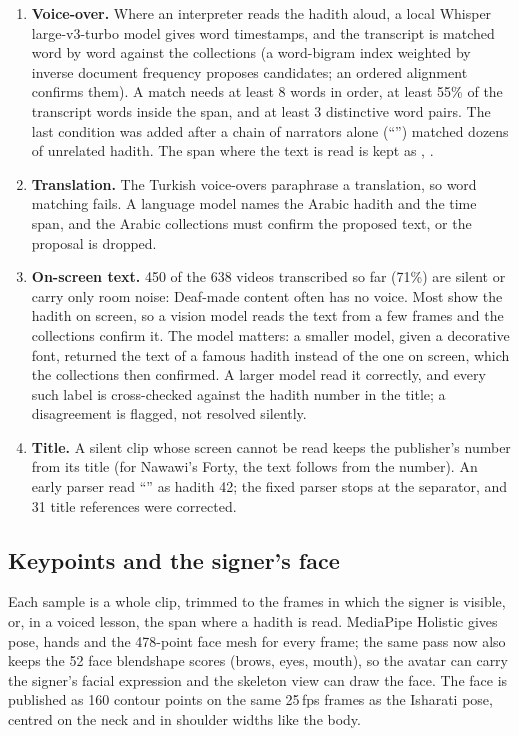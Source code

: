 \begin{enumerate}[leftmargin=*,itemsep=2pt]
  \item \textbf{Voice-over.} Where an interpreter reads the hadith aloud, a local Whisper large-v3-turbo model gives word
        timestamps, and the transcript is matched word by word against the collections (a word-bigram index weighted by
        inverse document frequency proposes candidates; an ordered alignment confirms them). A match needs at least
        8 words in order, at least 55\% of the transcript words inside the span, and at least 3 distinctive word pairs.
        The last condition was added after a chain of narrators alone (``'')
        matched dozens of unrelated hadith. The span where the text is read is kept as , .
  \item \textbf{Translation.} The Turkish voice-overs paraphrase a translation, so word matching fails. A language model
        names the Arabic hadith and the time span, and the Arabic collections must confirm the proposed text, or the
        proposal is dropped.
  \item \textbf{On-screen text.} 450 of the 638 videos transcribed so far (71\%) are silent or carry only room noise:
        Deaf-made content often has no voice. Most show the hadith on screen, so a vision model reads the text from a
        few frames and the collections confirm it. The model matters: a smaller model, given a decorative font, returned
        the text of a famous hadith instead of the one on screen, which the collections then confirmed. A larger model
        read it correctly, and every such label is cross-checked against the hadith number in the title; a disagreement
        is flagged, not resolved silently.
  \item \textbf{Title.} A silent clip whose screen cannot be read keeps the publisher's number from its title (for
        Nawawi's Forty, the text follows from the number). An early parser read ``''
        as hadith 42; the fixed parser stops at the separator, and 31 title references were corrected.
\end{enumerate}

\subsection{Keypoints and the signer's face}
Each sample is a whole clip, trimmed to the frames in which the signer is visible, or, in a voiced lesson, the span
where a hadith is read. MediaPipe Holistic \cite{mediapipeholistic} gives pose, hands and the 478-point face mesh for
every frame; the same pass now also keeps the 52 face blendshape scores (brows, eyes, mouth), so the avatar can carry
the signer's facial expression and the skeleton view can draw the face. The face is published as 160 contour points on
the same 25\,fps frames as the Isharati pose, centred on the neck and in shoulder widths like the body.


